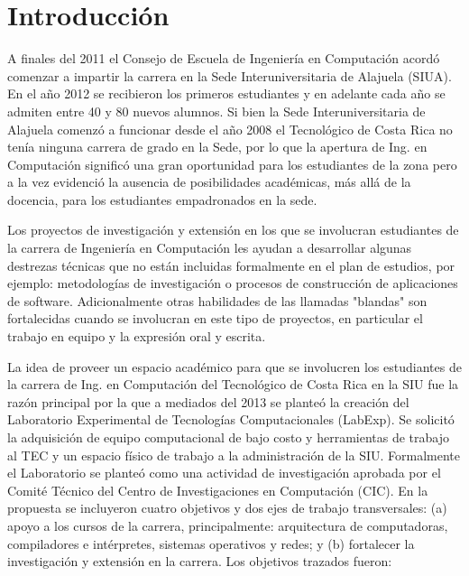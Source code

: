 \documentclass[conference]{IEEEtran}
\begin{document}
%
\IEEEpeerreviewmaketitle



\section{Introducción}

A finales del 2011 el Consejo de Escuela de Ingeniería en Computación acordó comenzar a impartir la carrera en la Sede Interuniversitaria de Alajuela (SIUA). En el año 2012 se recibieron los primeros estudiantes y en adelante cada año se admiten entre 40 y 80 nuevos alumnos. Si bien la Sede Interuniversitaria de Alajuela comenzó a funcionar desde el año 2008 el Tecnológico de Costa Rica no tenía ninguna carrera de grado en la Sede, por lo que la apertura de Ing. en Computación significó una gran oportunidad para los estudiantes de la zona pero a la vez evidenció la ausencia de posibilidades académicas, más allá de la docencia, para los estudiantes empadronados en la sede. 

Los proyectos de investigación y extensión en los que se involucran estudiantes de la carrera de Ingeniería en Computación les ayudan a desarrollar algunas destrezas técnicas que no están incluidas formalmente en el plan de estudios, por ejemplo: metodologías de investigación o procesos de construcción de aplicaciones de software. Adicionalmente otras habilidades de las llamadas "blandas" son fortalecidas cuando se involucran en este tipo de proyectos, en particular el trabajo en equipo y la expresión oral y escrita. 

La idea de proveer un espacio académico para que se involucren los estudiantes de la carrera de Ing. en Computación del Tecnológico de Costa Rica en la SIU fue la razón principal por la que a mediados del 2013 se planteó la creación del Laboratorio Experimental de Tecnologías Computacionales (LabExp). Se solicitó la adquisición de equipo computacional de bajo costo y herramientas de trabajo al TEC y un espacio físico de trabajo a la administración de la SIU. Formalmente el Laboratorio se planteó como una actividad de investigación aprobada por el Comité Técnico del Centro de Investigaciones en Computación (CIC). En la propuesta se incluyeron cuatro objetivos y dos ejes de trabajo transversales: (a) apoyo a los cursos de la carrera, principalmente: arquitectura de computadoras, compiladores e intérpretes, sistemas operativos y redes; y (b) fortalecer la investigación y extensión en la carrera. Los objetivos trazados fueron:
\end{document}
